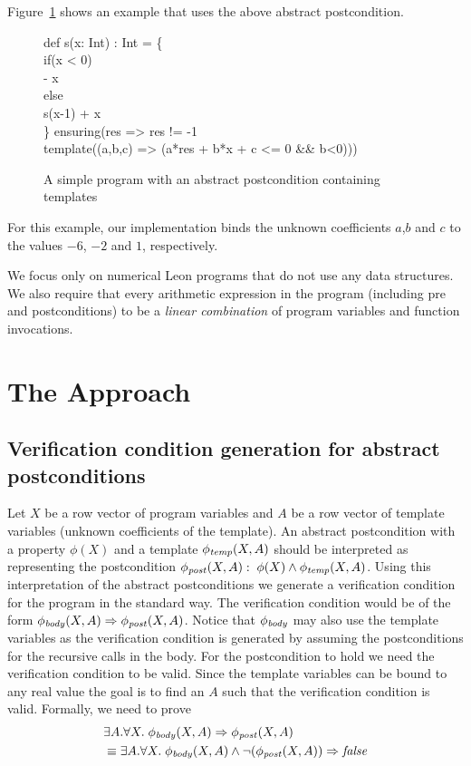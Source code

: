 \documentclass[a4paper,10pt]{article}
\begin{document}
Figure~\ref{fig:eg} shows an example that uses the above abstract postcondition.
%
\begin{figure}
\begin{myprogram}
\pnl \> def s(x: Int) : Int = \{ \\
\pnl \> \> if(x < 0) \\
\pnl \> \> \> - x \\
\pnl \> \> else  \\
\pnl \> \> \> 	s(x-1) + x\\
\pnl \> \} ensuring(res => res != -1  \\
\pnl \> \> \> template((a,b,c) => (a*res + b*x + c <= 0 \&\& b<0)))
\end{myprogram}
\caption{A simple program with an abstract postcondition containing templates} \label{fig:eg}
\end{figure}
%
For this example, our implementation binds the unknown coefficients $a$,$b$ and $c$ to 
the values $-6$, $-2$ and $1$, respectively.

We focus only on numerical Leon programs that do not use any data structures. We also require that every arithmetic expression in the program (including pre and postconditions) to be a \emph{linear combination} of program variables and function invocations.

\section{The Approach}


\subsection{Verification condition generation for abstract postconditions}

Let $X$ be a row vector of program variables and $A$ be a row vector of  template variables (unknown coefficients of the template).
An abstract postcondition with a property $\phi(X)$ and a template $\mathit{\phi_{temp}}(X,A)$ should be interpreted as representing the postcondition $\mathit{\phi_{post}}(X,A): \; \phi(X) \wedge \mathit{\phi_{temp}}(X,A)$.
Using this interpretation of the abstract postconditions we generate a verification condition 
for the program in the standard way. 
The verification condition would be of the form $\mathit{\phi_{body}}(X,A) \Rightarrow \mathit{\phi_{post}}(X,A)$. Notice that $\mathit{\phi_{body}}$ may also use the template variables as the verification condition is generated by assuming the postconditions for the recursive calls in the body.
For the postcondition to hold we need the verification condition to be valid. Since the template variables can be bound to any real value the goal is to find an $A$ such that the verification condition is valid. Formally, we need to prove
%
\begin{align}
& \exists A. \forall X. \; \mathit{\phi_{body}}(X,A) \Rightarrow \mathit{\phi_{post}}(X,A) \\
& \equiv  \exists A. \forall X. \; \mathit{\phi_{body}}(X,A) \wedge \neg(\mathit{\phi_{post}}(X,A)) \Rightarrow \mathit{false}
\label{eq:tempvc}
\end{align}
\end{document}
